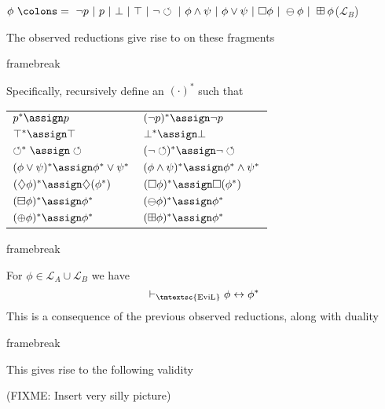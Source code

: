 {\hspace*{\fill}}$\phi \text{ } \colons = \text{ } \neg p \text{ } | \text{ }
p \text{ } | \text{ } \bot \text{ } | \text{ } \top \text{ } | \text{ } \neg
\circlearrowleft \text{ } | \text{ } \phi \wedge \psi \text{ } | \text{ } \phi
\vee \psi \text{ } | \text{ } \Box  \phi \text{ } | \text{ } \ominus \phi
\text{ } | \text{ } \boxplus \phi${\hspace*{\fill}}($\mathcal{L}_B$)

The observed reductions give rise to  on these
fragments

framebreak

Specifically, recursively define an 
$(\cdot)^{\ast}$ such that

\begin{center}
  \begin{tabular}{ll}
    $p^{\ast} \assign p$ & $(\neg p)^{\ast} \assign \neg p$\\
    $\top^{\ast} \assign \top$ & $\bot^{\ast} \assign \bot$\\
    $\circlearrowleft^{\ast} \assign \circlearrowleft$ & $(\neg
    \circlearrowleft)^{\ast} \assign \neg \circlearrowleft$\\
    $(\phi \vee \psi)^{\ast} \assign \phi^{\ast} \vee \psi^{\ast}$ & $(\phi
    \wedge \psi)^{\ast} \assign \phi^{\ast} \wedge \psi^{\ast}$\\
    $(\diamondsuit \phi)^{\ast} \assign \diamondsuit (\phi^{\ast})$ & $(\Box 
    \phi)^{\ast} \assign \Box (\phi^{\ast})$\\
    $(\boxminus \phi)^{\ast} \assign \phi^{\ast}$ & $(\ominus \phi)^{\ast}
    \assign \phi^{\ast}$\\
    $(\oplus \phi)^{\ast} \assign \phi^{\ast}$ & $(\boxplus \phi)^{\ast}
    \assign \phi^{\ast}$
  \end{tabular}
\end{center}

framebreak

For $\phi \in \mathcal{L}_A \cup \mathcal{L}_B$ we have
\[ \vdash_{\text{\tmtextsc{EviL}}} \phi \leftrightarrow \phi^{\ast} \]
This is a consequence of the previous observed reductions, along with duality

framebreak

This gives rise to the following  validity

(FIXME: Insert very silly picture)



